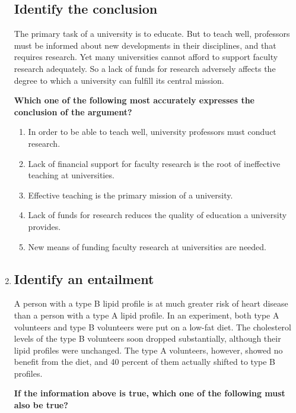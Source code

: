 \documentclass[9pt]{article}
\begin{document}
\begin{multicols}{3}
\begin{enumerate}
\subsection*{Identify the conclusion}

\noindent
The primary task of a university is to educate. But to teach well, professors must be informed about new developments in their disciplines, and that requires research. Yet many universities cannot afford to support faculty research adequately. So a lack of funds for research adversely affects the degree to which a university can fulfill its central mission.

 
\noindent

\textbf{Which one of the following most accurately expresses the conclusion of the argument?}

\begin{enumerate}[label=(\alph*)]
    \item In order to be able to teach well, university professors must conduct research.
    \item Lack of financial support for faculty research is the root of ineffective teaching at universities.
    \item Effective teaching is the primary mission of a university.
    \item Lack of funds for research reduces the quality of education a university provides.
    \item New means of funding faculty research at universities are needed.
\end{enumerate}

\item
\subsection*{Identify an entailment}
\noindent
A person with a type B lipid profile is at much greater risk of heart disease than a person with a type A lipid profile. In an experiment, both type A volunteers and type B volunteers were put on a low-fat diet. The cholesterol levels of the type B volunteers soon dropped substantially, although their lipid profiles were unchanged. The type A volunteers, however, showed no benefit from the diet, and 40 percent of them actually shifted to type B profiles.

 

\noindent
\textbf{If the information above is true, which one of the following must also be true?}


\end{enumerate}
\end{multicols}
\end{document}
